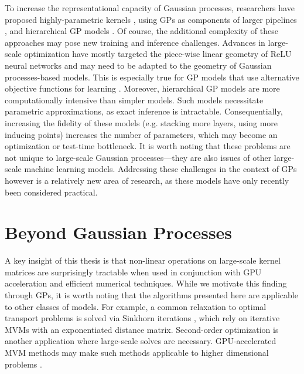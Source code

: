 To increase the representational capacity of Gaussian processes, researchers have proposed highly-parametric kernels \cite{wilson2013gaussian,wilson2016stochastic}, using GPs as components of larger pipelines \cite{schulam2015framework,futoma2017learning}, and hierarchical GP models \cite{wilson2012gaussian,salimbeni2017doubly,jankowiak2020deep}.
Of course, the additional complexity of these approaches may pose new training and inference challenges.
Advances in large-scale optimization have mostly targeted the piece-wise linear geometry of ReLU neural networks and may need to be adapted to the geometry of Gaussian processes-based models.
This is especially true for GP models that use alternative objective functions for learning \cite{sheth2017excess,knoblauch2019generalized,jankowiak2020parametric}.
Moreover, hierarchical GP models are more computationally intensive than simpler models.
Such models necessitate parametric approximations, as exact inference is intractable.
Consequentially, increasing the fidelity of these models (e.g. stacking more layers, using more inducing points) increases the number of parameters, which may become an optimization or test-time bottleneck.
It is worth noting that these problems are not unique to large-scale Gaussian processes---they are also issues of other large-scale machine learning models.
Addressing these challenges in the context of GPs however is a relatively new area of research, as these models have only recently been considered practical.




\section{Beyond Gaussian Processes}

A key insight of this thesis is that non-linear operations on large-scale kernel matrices are surprisingly tractable when used in conjunction with GPU acceleration and efficient numerical techniques.
While we motivate this finding through GPs, it is worth noting that the algorithms presented here are applicable to other classes of models.
For example, a common relaxation to optimal transport problems is solved via Sinkhorn iterations \cite{cuturi2013sinkhorn}, which rely on iterative MVMs with an exponentiated distance matrix.
Second-order optimization is another application where large-scale solves are necessary.
GPU-accelerated MVM methods may make such methods applicable to higher dimensional problems \cite{koh2017understanding}.

